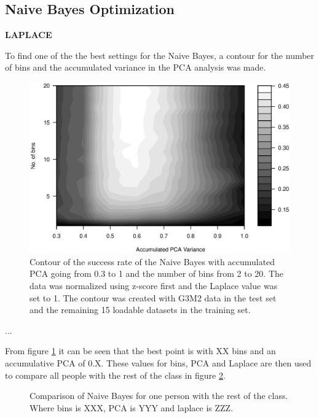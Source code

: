 \subsection{Naive Bayes Optimization}
\textbf{LAPLACE}

To find one of the the best settings for the Naive Bayes, a contour for the number of bins and the accumulated variance in the PCA analysis was made.

\begin{figure}[H]
\centering
\includegraphics[width = \textwidth]{graphics/contour_bins_vs_pca_04_L1_NZ}
\caption{Contour of the success rate of the Naive Bayes with accumulated PCA going from 0.3 to 1 and the number of bins from 2 to 20.
The data was normalized using z-score first and the Laplace value was set to 1.
The contour was created with G3M2 data in the test set and the remaining 15 loadable datasets in the training set.}
\label{fig:contour_bin-vs-pca}
\end{figure}

...

From figure \ref{fig:contour_bin-vs-pca} it can be seen that the best point is with XX bins and an accumulative PCA of 0.X.
These values for bins, PCA and Laplace are then used to compare all people with the rest of the class in figure \ref{fig:comp_naiveBayes}.

\begin{figure}[H]
\centering
\caption{Comparison of Naive Bayes for one person with the rest of the class.
Where bins is XXX, PCA is YYY and laplace is ZZZ.}
\label{fig:comp_naiveBayes}
\end{figure}






